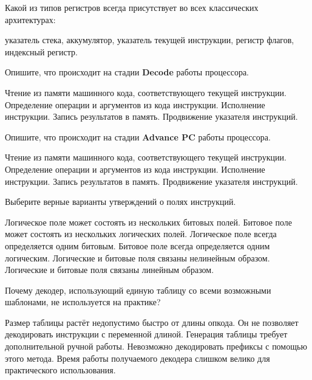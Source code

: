 \begin{questions}

\question[3] Какой из типов регистров всегда присутствует во всех классических архитектурах:
\begin{choices}
\choice указатель стека,
\choice аккумулятор,
\correctchoice указатель текущей инструкции,
\choice регистр флагов,
\choice индексный регистр.
\end{choices}

\question[3] Опишите, что происходит на стадии \textbf{Decode} работы процессора.
\begin{choices}
    \choice Чтение из памяти машинного кода, соответствующего текущей инструкции.
    \correctchoice Определение операции и аргументов из кода инструкции.
    \choice Исполнение инструкции.
    \choice Запись результатов в память.
    \choice Продвижение указателя инструкций.
\end{choices}

\question[3] Опишите, что происходит на стадии \textbf{Advance PC} работы процессора. %
\begin{choices}
    \choice Чтение из памяти машинного кода, соответствующего текущей инструкции.
    \choice Определение операции и аргументов из кода инструкции.
    \choice Исполнение инструкции.
    \choice Запись результатов в память.
    \correctchoice Продвижение указателя инструкций.
\end{choices}

\question[3] Выберите верные варианты утверждений о полях инструкций.
\begin{choices}
    \correctchoice  Логическое поле может состоять из нескольких битовых полей.
    \choice Битовое поле может состоять из нескольких логических полей.
    \choice Логическое поле всегда определяется одним битовым.
    \choice Битовое поле всегда определяется одним логическим.
    \correctchoice Логические и битовые поля связаны нелинейным образом.
    \choice Логические и битовые поля связаны линейным образом.
\end{choices}

\question[3] Почему декодер, использующий единую таблицу со всеми возможными шаблонами, не используется на практике?
\begin{choices}
    \correctchoice  Размер таблицы растёт недопустимо быстро от длины опкода.
    \choice Он не позволяет декодировать инструкции с переменной длиной.
    \choice Генерация таблицы требует дополнительной ручной работы.
    \choice Невозможно декодировать префиксы с помощью этого метода.
    \choice Время работы получаемого декодера слишком велико для практического использования.
\end{choices}


\end{questions}
